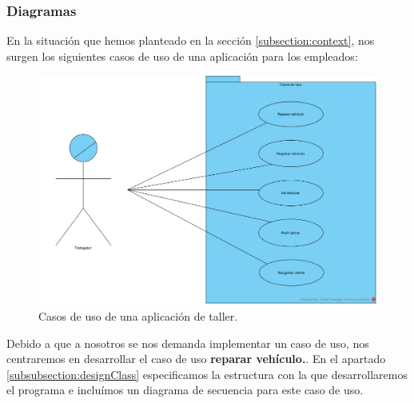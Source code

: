 \documentclass{article}
\begin{document}
\subsubsection{Diagramas}
En la situación que hemos planteado en la sección \ref{subsection:context}, nos surgen los siguientes casos de uso de una aplicación para los empleados:
\begin{figure}[H]
  \centering
  \includegraphics[width=1.0\textwidth]{misc/CasosDeUsoTalleresGutierrez.png}
  \caption{Casos de uso de una aplicación de taller.}
\end{figure}
Debido a que a nosotros se nos demanda implementar un caso de uso, nos centraremos en desarrollar el caso de uso \textbf{reparar vehículo.}.
En el apartado \ref{subsubsection:designClass} especificamos la estructura con la que desarrollaremos el programa e incluímos un diagrama de secuencia para este caso de uso. 
\end{document}
